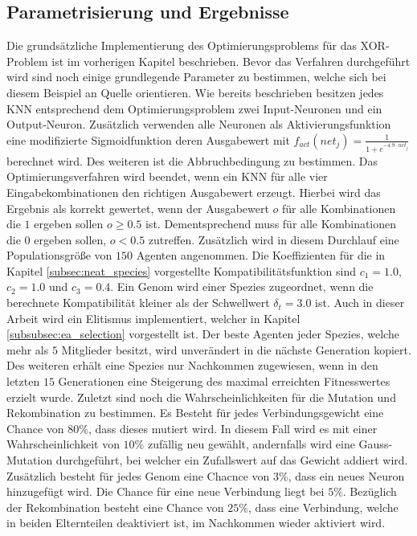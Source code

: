 \subsection{Parametrisierung und Ergebnisse}
Die grundsätzliche Implementierung des Optimierungsproblems für das XOR-Problem ist im vorherigen Kapitel beschrieben. Bevor das Verfahren durchgeführt wird sind noch einige grundlegende Parameter zu bestimmen, welche sich bei diesem Beispiel an Quelle \cite{stanley2002evolving} orientieren. Wie bereits beschrieben besitzen jedes \ac{KNN} entsprechend dem Optimierungsproblem zwei Input-Neuronen und ein Output-Neuron. Zusätzlich verwenden alle Neuronen als Aktivierungsfunktion eine modifizierte Sigmoidfunktion deren Ausgabewert mit $f_{act}(net_j)=\frac{1}{1+e^{-4.9\cdot net_j}}$ berechnet wird. Des weiteren ist die Abbruchbedingung zu bestimmen. Das Optimierungsverfahren wird beendet, wenn ein \ac{KNN} für alle vier Eingabekombinationen den richtigen Ausgabewert erzeugt. Hierbei wird das Ergebnis als korrekt gewertet, wenn der Ausgabewert $o$ für alle Kombinationen die $1$ ergeben sollen $o \geq 0.5$ ist. Dementsprechend muss für alle Kombinationen die $0$ ergeben sollen, $o < 0.5$ zutreffen. Zusätzlich wird in diesem Durchlauf eine Populationsgröße von $150$ Agenten angenommen. Die Koeffizienten für die in Kapitel \ref{subsec:neat_species} vorgestellte Kompatibilitätsfunktion sind $c_1=1.0$, $c_2=1.0$ und $c_3=0.4$. Ein Genom wird einer Spezies zugeordnet, wenn die berechnete Kompatibilität kleiner als der Schwellwert $\delta_t=3.0$ ist. Auch in dieser Arbeit wird ein Elitismus implementiert, welcher in Kapitel \ref{subsubsec:ea_selection} vorgestellt ist. Der beste Agenten jeder Spezies, welche mehr als $5$ Mitglieder besitzt, wird unverändert in die nächste Generation kopiert. Des weiteren erhält eine Spezies nur Nachkommen zugewiesen, wenn in den letzten $15$ Generationen eine Steigerung des maximal erreichten Fitnesswertes erzielt wurde. Zuletzt sind noch die Wahrscheinlichkeiten für die Mutation und Rekombination zu bestimmen. Es Besteht für jedes Verbindungsgewicht eine Chance von $80\%$, dass dieses mutiert wird. In diesem Fall wird es mit einer Wahrscheinlichkeit von $10\%$ zufällig neu gewählt, andernfalls wird eine Gauss-Mutation durchgeführt, bei welcher ein Zufallswert auf das Gewicht addiert wird. Zusätzlich besteht für jedes Genom eine Chacnce von $3\%$, dass ein neues Neuron hinzugefügt wird. Die Chance für eine neue Verbindung liegt bei  $5\%$. Bezüglich der Rekombination besteht eine Chance von $25\%$, dass eine Verbindung, welche in beiden Elternteilen deaktiviert ist, im Nachkommen wieder aktiviert wird. 
